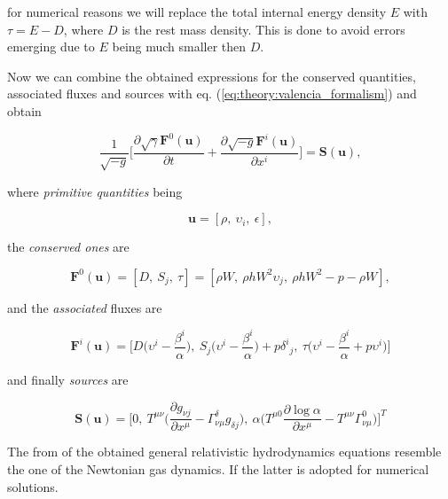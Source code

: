 for numerical reasons we will replace the total internal energy density $E$ with $\tau = E-D$, where $D$ is the rest mass density. 
This is done to avoid errors emerging due to $E$ being much smaller then $D$. 

Now we can combine the obtained expressions for the conserved quantities, associated fluxes and sources with eq. (\ref{eq:theory:valencia_formalism}) and obtain

\begin{equation}
\frac{1}{\sqrt{-g}}\Big[\frac{\partial\sqrt{\gamma}\boldsymbol{F}^{0}(\boldsymbol{u})}{\partial t} + \frac{\partial\sqrt{-g}\boldsymbol{F}^{i}(\boldsymbol{u})}{\partial x^i}\Big] = \boldsymbol{S}(\boldsymbol{u}),
\label{eq:theory:grhdeq_thc} %
\end{equation}

where \textit{primitive quantities} being

\begin{equation}
\boldsymbol{u} = [\rho,\: \upsilon_i,\: \epsilon],
\end{equation}

the \textit{conserved ones} are 

\begin{equation}
\boldsymbol{F}^0(\boldsymbol{u}) = [D,\: S_j,\: \tau] = [\rho W,\: \rho h W^2 \upsilon_j,\: \rho h W^2 - p - \rho W],
\end{equation}

and the \textit{associated} fluxes are 

\begin{equation}
\boldsymbol{F}^i(\boldsymbol{u})=\Bigg[D\Big(\upsilon^{i}-\frac{\beta^i}{\alpha}\Big),\: S_{j}\Big(\upsilon^{i}-\frac{\beta^i}{\alpha}\Big)+p{\delta^i}_j ,\: \tau\Big(\upsilon^{i}-\frac{\beta^i}{\alpha}+p\upsilon^i\Big)\Bigg]
\end{equation}

and finally \textit{sources} are

\begin{equation}
\boldsymbol{S}(\boldsymbol{u}) = \Bigg[0,\: T^{\mu\nu}\Big(\frac{\partial g_{\nu j}}{\partial x^{\mu}} - \Gamma^{\delta}_{\nu\mu}g_{\delta j}\Big),\: \alpha\Big(T^{\mu 0}\frac{\partial\log\alpha}{\partial x^{\mu}}-T^{\mu\nu}\Gamma^{0}_{\nu\mu}\Big)\Bigg]^T
\end{equation}

The from of the obtained general relativistic hydrodynamics equations resemble the one of the Newtonian gas dynamics. If the latter is adopted for numerical solutions. 

